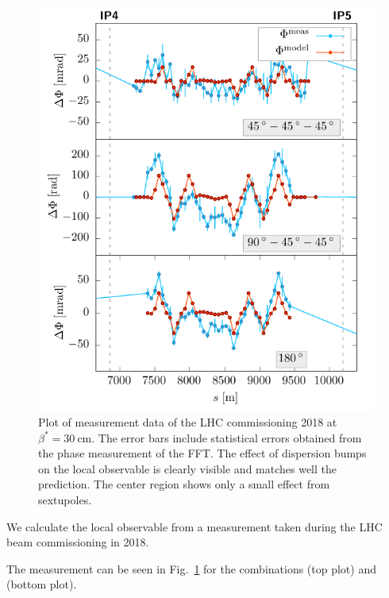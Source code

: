 \begin{figure}[t]
  \centering
  \includegraphics[width=.8\linewidth]{meas}
  \caption{Plot of measurement data of the LHC commissioning 2018 at $\beta^*=\SI{30}{\centi\metre}$.
    The error bars include statistical errors
    obtained from the phase measurement of the FFT.
    The effect of dispersion bumps on the local observable is clearly visible and matches well the
    prediction. The center region shows only a small effect from sextupoles.
  }
  \label{fig_measlobster002}
\end{figure}
%
We calculate the local observable from a measurement taken during the LHC beam commissioning in 2018.

The measurement can be seen in Fig.~\ref{fig_measlobster002} for the combinations 
(top plot) and  (bottom plot).

